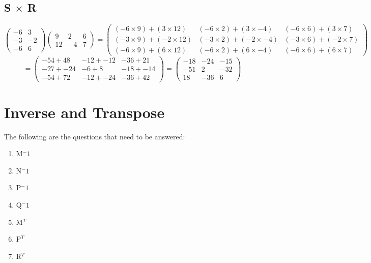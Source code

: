 \documentclass[a4paper,12pt]{article}
\begin{document}
      \subsection{S $\times$ R}
        \begin{equation}
          \begin{pmatrix}
            -6 & 3\\
            -3 & -2\\
            -6 & 6
          \end{pmatrix}
          \begin{pmatrix}
            9 & 2 & 6\\
            12 & -4 & 7
          \end{pmatrix}
          =
          \begin{pmatrix}
            (-6 \times 9) + ( 3 \times 12) & (-6 \times 2) + ( 3 \times -4) & (-6 \times 6) + ( 3 \times 7)\\
            (-3 \times 9) + (-2 \times 12) & (-3 \times 2) + (-2 \times -4) & (-3 \times 6) + (-2 \times 7)\\
            (-6 \times 9) + ( 6 \times 12) & (-6 \times 2) + ( 6 \times -4) & (-6 \times 6) + ( 6 \times 7)
          \end{pmatrix}
        \end{equation}
        \begin{equation}
          =
          \begin{pmatrix}
            -54 +  48 & -12 + -12 & -36 +  21\\
            -27 + -24 & -6  +   8 & -18 + -14\\
            -54 +  72 & -12 + -24 & -36 +  42
          \end{pmatrix}
          =
          \begin{pmatrix}
            -18 & -24 & -15\\
            -51 &   2 & -32\\
             18 & -36 &   6
          \end{pmatrix}
        \end{equation}

    \newpage

    \section{Inverse and Transpose}
      The following are the questions that need to be answered:

      \begin{enumerate}
        \item M$^-1$
        \item N$^-1$
        \item P$^-1$
        \item Q$^-1$
        \item M$^T$
        \item P$^T$
        \item R$^T$
      \end{enumerate}
\end{document}

